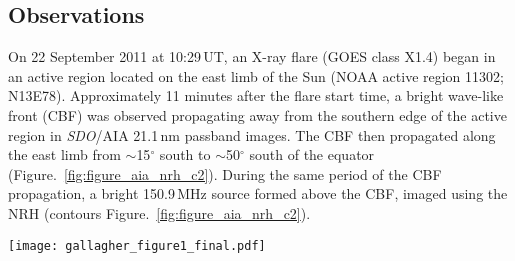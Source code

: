 \subsection{Observations}
On 22 September 2011 at 10:29\,UT, an X-ray flare (GOES class X1.4) began in an active region located on the east limb of the Sun (NOAA active region 11302; N13E78). Approximately 11 minutes after the flare start time, a bright wave-like front (CBF) was observed propagating away from the southern edge of the active region in \emph{SDO}/AIA 21.1\,nm passband images. The CBF then propagated along the east limb from $\sim$15$^{\circ}\,$\,south to $\sim$50$^{\circ}\,$\,south of the equator (Figure.~\ref{fig:figure_aia_nrh_c2}). During the same period of the CBF propagation, a bright 150.9\,MHz source formed above the CBF, imaged using the NRH (contours Figure.~\ref{fig:figure_aia_nrh_c2}). 
%
%
\begin{sidewaysfigure}
    \centering
	\texttt{[image: gallagher\_figure1\_final.pdf]}
	\caption[Propagation of CBF and radio burst]{{\bf a-f} show that the 150\,MHz source follows closely the coronal bright front (CBF) as it propagates around the east limb, indicating they belong to a common structure. The intensity of the radio source is indicated by the colour bar on the right. {\bf c} reveals the role of the CME in the event, as observed by the LASCO C2 coronagraph. The combination of the white-light coronagraph (C2) and the EUV images (AIA) reveal the full spatial extent of the CME bubble i.e., the frontal structure in white-light has clear extensions back toward the solar surface, imaged at EUV. The location of the radio source and CBF show they clearly have a relationship with the southward CME flank.}
	\label{fig:figure_aia_nrh_c2}
\end{sidewaysfigure}
%
%
